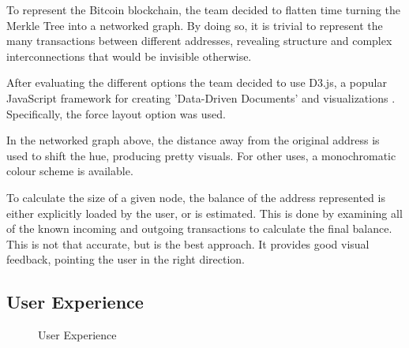 \documentclass{article}
\begin{document}
To represent the Bitcoin blockchain, the team decided to flatten time turning the Merkle Tree into a networked graph. By doing so, it is trivial to represent the many transactions between different addresses, revealing structure and complex interconnections that would be invisible otherwise.

After evaluating the different options the team decided to use D3.js, a popular JavaScript framework for creating 'Data-Driven Documents' and visualizations \cite{d3js}. Specifically, the force layout option was used.

In the networked graph above, the distance away from the original address is used to shift the hue, producing pretty visuals. For other uses, a monochromatic colour scheme is available.

To calculate the size of a given node, the balance of the address represented is either explicitly loaded by the user, or is estimated. This is done by examining all of the known incoming and outgoing transactions to calculate the final balance. This is not that accurate, but is the best approach. It provides good visual feedback, pointing the user in the right direction.

\subsection{User Experience}

\begin{figure}[H]
  \centering
  \qquad
  \caption{User Experience}
  \label{fig:userexperience}
\end{figure}
\end{document}
